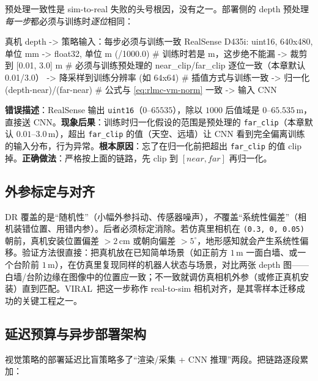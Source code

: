 预处理一致性是 sim-to-real 失败的头号根因，没有之一。部署侧的 depth 预处理\emph{每一步}都必须与训练时\emph{逐位}相同：

\begin{codebox}{真机 depth -> 策略输入：每步必须与训练一致}
RealSense D435i: uint16, 640x480, 单位 mm
  -> float32, 单位 m (/1000.0)         # 训练时若是 m，这步绝不能漏
  -> 裁剪到 [0.01, 3.0] m              # 必须与训练预处理的 near_clip/far_clip 逐位一致（本章默认 0.01/3.0）
  -> 降采样到训练分辨率 (如 64x64)      # 插值方式与训练一致
  -> 归一化 (depth-near)/(far-near)    # 公式与 \eqref{eq:rlmc-vm-norm} 一致
  -> 输入 CNN
\end{codebox}

\begin{pitfall}
\textbf{错误描述}：RealSense 输出 \verb|uint16|（$0$--$65535$），除以 $1000$ 后值域是 $0$--$65.535$\,m，直接送 CNN。\textbf{现象后果}：训练时归一化假设的范围是预处理的 \verb|far_clip|（本章默认 $0.01$--$3.0$\,m），超出 \verb|far_clip| 的值（天空、远墙）让 CNN 看到完全偏离训练的输入分布，行为异常。\textbf{根本原因}：忘了在归一化前把超出 \verb|far_clip| 的值 clip 掉。\textbf{正确做法}：严格按上面的链路，先 clip 到 $[near, far]$ 再归一化。
\end{pitfall}

\subsection{外参标定与对齐}
\label{sec:rlmc-vm-extrinsics}

DR 覆盖的是“随机性”（小幅外参抖动、传感器噪声），\emph{不}覆盖“系统性偏差”（相机装错位置、用错内参）。后者必须标定消除。若仿真里相机在 \verb|(0.3, 0, 0.05)| 朝前，真机安装位置偏差 $>2$\,cm 或朝向偏差 $>5^\circ$，地形感知就会产生系统性偏移。验证方法很直接：把真机放在已知简单场景（如正前方 $1$\,m 一面白墙、或一个台阶前 $1$\,m），在仿真里复现同样的机器人状态与场景，对比两张 depth 图——白墙/台阶边缘在图像中的位置应一致；不一致就调仿真相机外参（或修正真机安装）直到匹配。VIRAL\,\cite{he2025viral} 把这一步称作 real-to-sim 相机对齐，是其零样本迁移成功的关键工程之一。

\subsection{延迟预算与异步部署架构}
\label{sec:rlmc-vm-latency}

视觉策略的部署延迟比盲策略多了“渲染/采集 + CNN 推理”两段。把链路逐段累加：

